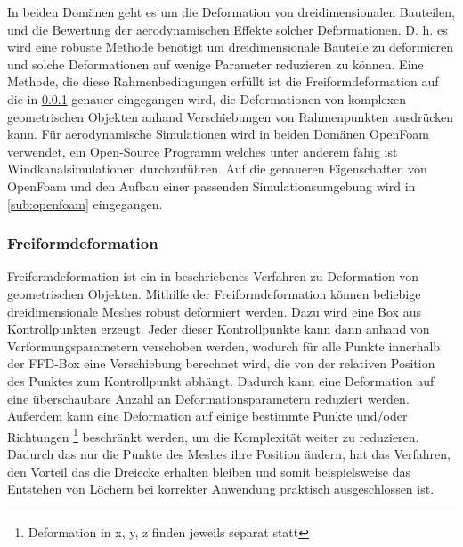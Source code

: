 In beiden Domänen geht es um die Deformation von dreidimensionalen Bauteilen, und die Bewertung der aerodynamischen Effekte solcher Deformationen.
D. h. es wird eine robuste Methode benötigt um dreidimensionale Bauteile zu deformieren und solche Deformationen auf wenige Parameter reduzieren zu können.
Eine Methode, die diese Rahmenbedingungen erfüllt ist die Freiformdeformation \cite{Sederberg.1986} auf die in \ref{sub:ffd} genauer eingegangen wird, die Deformationen von komplexen geometrischen Objekten anhand Verschiebungen von Rahmenpunkten ausdrücken kann.
Für aerodynamische Simulationen wird in beiden Domänen OpenFoam verwendet, ein Open-Source Programm welches unter anderem fähig ist Windkanalsimulationen durchzuführen.
Auf die genaueren Eigenschaften von OpenFoam und den Aufbau einer passenden Simulationsumgebung wird in \ref{sub:openfoam} eingegangen.

\subsubsection{Freiformdeformation}
\label{sub:ffd}
Freiformdeformation ist ein in \cite{Sederberg.1986} beschriebenes Verfahren zu Deformation von geometrischen Objekten.
Mithilfe der Freiformdeformation können beliebige dreidimensionale Meshes robust deformiert werden.
Dazu wird eine Box aus Kontrollpunkten erzeugt.
Jeder dieser Kontrollpunkte kann dann anhand von Verformungsparametern verschoben werden, wodurch für alle Punkte innerhalb der FFD-Box eine Verschiebung berechnet wird, die von der relativen Position des Punktes zum Kontrollpunkt abhängt.
Dadurch kann eine Deformation auf eine überschaubare Anzahl an Deformationsparametern reduziert werden.
Außerdem kann eine Deformation auf einige bestimmte Punkte und/oder Richtungen
\footnote{Deformation in x, y, z finden jeweils separat statt}
beschränkt werden, um die Komplexität weiter zu reduzieren.
Dadurch das nur die Punkte des Meshes ihre Position ändern, hat das Verfahren, den Vorteil das die Dreiecke erhalten bleiben und somit beispielsweise das Entstehen von Löchern bei korrekter Anwendung praktisch ausgeschlossen ist.


